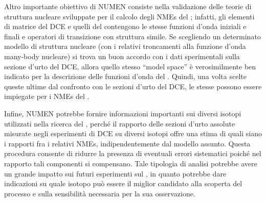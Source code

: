 Altro importante obiettivo di NUMEN consiste nella validazione delle teorie di struttura nucleare sviluppate per il calcolo degli NMEs del \doppiobeta{};
infatti, gli elementi di matrice del DCE e quelli del \doppiobeta{} contengono le stesse funzioni d'onda iniziali e finali e operatori di transizione con struttura simile. Se scegliendo un determinato modello di struttura nucleare (con i relativi troncamenti alla funzione d'onda many-body nucleare) si trova un buon accordo con i dati sperimentali sulla sezione d'urto del DCE, allora quello stesso ``model space'' è verosimilmente ben indicato per la descrizione delle funzioni d'onda del \doppiobeta.
Quindi, una volta scelte queste ultime dal confronto con le sezioni d'urto del DCE, le stesse possono essere impiegate per i NMEs del \doppiobeta{}. 

Infine, NUMEN potrebbe fornire informazioni importanti sui diversi isotopi utilizzati nella ricerca del \doppiobeta{}, perché il rapporto delle sezioni d'urto assolute misurate negli esperimenti di DCE su diversi isotopi offre una stima di quali siano i rapporti fra i relativi NMEs, indipendentemente dal modello assunto. 
Questa procedura consente di ridurre la presenza di eventuali errori sistematici poiché nel rapporto tali componenti si compensano.
Tale tipologia di analisi potrebbe avere un grande impatto sui futuri esperimenti sul \doppiobeta{}, in quanto potrebbe dare indicazioni su quale isotopo può essere il miglior candidato alla scoperta del processo e sulla sensibilità necessaria per la sua osservazione. 


